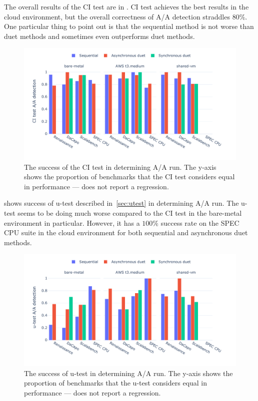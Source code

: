 The overall results of the CI test are in .
CI test achieves the best results in the cloud environment, but the overall correctness of A/A detection straddles $80\%$.
One particular thing to point out is that the sequential method is not worse than duet methods and sometimes even outperforms duet methods.

\begin{figure}
	\centering
	\includegraphics[width=1\linewidth]{./figures/citest_aa_match.pdf}
	\caption{
		The success of the CI test in determining A/A run.
		The \mbox{y-axis} shows the proportion of benchmarks that the CI test considers equal in performance --- does not report a regression.
	}
	\label{fig:citest_aa}
\end{figure}

 shows success of \mbox{u-test} described in~\cref{sec:utest} in determining A/A run.
The \mbox{u-test} seems to be doing much worse compared to the CI test in the \mbox{bare-metal} environment in particular.
However, it has a $100\%$ success rate on the SPEC CPU suite in the cloud environment for both sequential and asynchronous duet methods.

\begin{figure}
	\centering
	\includegraphics[width=1\linewidth]{./figures/utest_aa_match.pdf}
	\caption{
		The success of \mbox{u-test} in determining A/A run.
		The \mbox{y-axis} shows the proportion of benchmarks that the \mbox{u-test} considers equal in performance --- does not report a regression.
	}
	\label{fig:utest_aa}
\end{figure}

